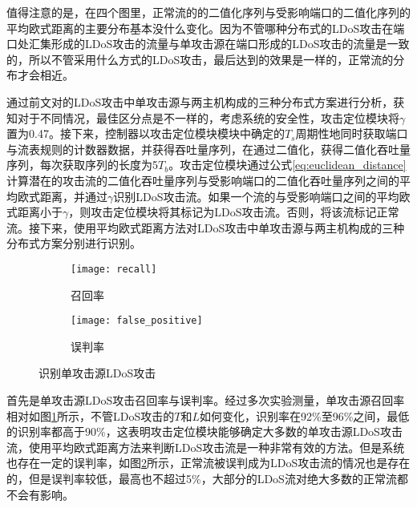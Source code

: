 值得注意的是，在四个图里，正常流的的二值化序列与受影响端口的二值化序列的平均欧式距离的主要分布基本没什么变化。因为不管哪种分布式的LDoS攻击在端口处汇集形成的LDoS攻击的流量与单攻击源在端口形成的LDoS攻击的流量是一致的，所以不管采用什么方式的LDoS攻击，最后达到的效果是一样的，正常流的分布才会相近。

通过前文对的LDoS攻击中单攻击源与两主机构成的三种分布式方案进行分析，获知对于不同情况，最佳区分点是不一样的，考虑系统的安全性，攻击定位模块将$\gamma$置为0.47。接下来，控制器以攻击定位模块模块中确定的$T_s$周期性地同时获取端口与流表规则的计数器数据，并获得吞吐量序列，在通过二值化，获得二值化吞吐量序列，每次获取序列的长度为5$T_b$。攻击定位模块通过公式\ref{eq:euclidean_distance}计算潜在的攻击流的二值化吞吐量序列与受影响端口的二值化吞吐量序列之间的平均欧式距离，并通过$\gamma$识别LDoS攻击流。如果一个流的与受影响端口之间的平均欧式距离小于$\gamma$，则攻击定位模块将其标记为LDoS攻击流。否则，将该流标记正常流。接下来，使用平均欧式距离方法对LDoS攻击中单攻击源与两主机构成的三种分布式方案分别进行识别。


\begin{figure}
    \begin{subfigure}{.49\textwidth}
        \centering
        \texttt{[image: recall]}
        \caption{召回率}
        \label{fig:recall}
    \end{subfigure}
    \begin{subfigure}{.49\textwidth}
        \centering
        \texttt{[image: false\_positive]}
        \caption{误判率}
        \label{fig:false-positive}
    \end{subfigure}
    \caption{识别单攻击源LDoS攻击}
    \label{fig:accuracy-single}
\end{figure}

首先是单攻击源LDoS攻击召回率与误判率。经过多次实验测量，单攻击源召回率相对如图\ref{fig:recall}所示，不管LDoS攻击的$T$和$L$如何变化，识别率在92\%至96\%之间，最低的识别率都高于90\%，这表明攻击定位模块能够确定大多数的单攻击源LDoS攻击流，使用平均欧式距离方法来判断LDoS攻击流是一种非常有效的方法。但是系统也存在一定的误判率，如图\ref{fig:false-positive}所示，正常流被误判成为LDoS攻击流的情况也是存在的，但是误判率较低，最高也不超过5\%，大部分的LDoS流对绝大多数的正常流都不会有影响。



